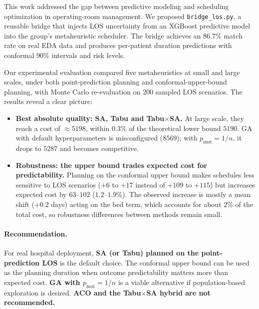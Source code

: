 \documentclass[11pt,a4paper]{article}
\begin{document}
This work addressed the gap between predictive modeling and scheduling optimization in operating-room management. We proposed \texttt{bridge\_los.py}, a reusable bridge that injects LOS uncertainty from an XGBoost predictive model into the group's metaheuristic scheduler. The bridge achieves an \(86.7\%\) match rate on real EDA data and produces per-patient duration predictions with conformal 90\% intervals and risk levels.

Our experimental evaluation compared five metaheuristics at small and large scales, under both point-prediction planning and conformal-upper-bound planning, with Monte Carlo re-evaluation on \(200\) sampled LOS scenarios. The results reveal a clear picture:

\begin{itemize}
  \item \textbf{Best absolute quality: SA, Tabu and Tabu\(\times\)SA.} At large scale, they reach a cost of \(\approx 5198\), within \(0.3\%\) of the theoretical lower bound \(5190\). GA with default hyperparameters is misconfigured (\(8569\)); with \(p_{\mathrm{mut}}=1/n\), it drops to \(5287\) and becomes competitive.
  \item \textbf{Robustness: the upper bound trades expected cost for predictability.} Planning on the conformal upper bound makes schedules less sensitive to LOS scenarios (\(+6\) to \(+17\) instead of \(+109\) to \(+115\)) but increases expected cost by \(63\)--\(102\) (\(1.2\)--\(1.9\%\)). The observed increase is mostly a mean shift (\(+0.2\) days) acting on the bed term, which accounts for about \(2\%\) of the total cost, so robustness differences between methods remain small.
\end{itemize}

\paragraph{Recommendation.} For real hospital deployment, \textbf{SA (or Tabu) planned on the point-prediction LOS} is the default choice. The conformal upper bound can be used as the planning duration when outcome predictability matters more than expected cost. \textbf{GA with \(p_{\mathrm{mut}}=1/n\)} is a viable alternative if population-based exploration is desired. \textbf{ACO and the Tabu\(\times\)SA hybrid are not recommended.}
\end{document}
